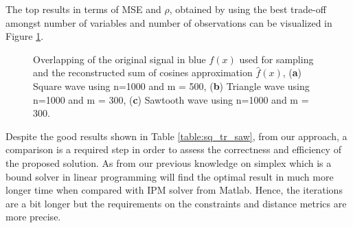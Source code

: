 \documentclass[journal,article,submit,electronics,pdftex]{Definitions/mdpi}
\begin{document}
{The top results in terms of MSE and $\rho$, obtained by using the best trade-off amongst number of variables and number of observations can be visualized in Figure \ref{fig:square_tr_saw}. 

\begin{figure}[H]
\centering
\hspace*{\fill}
%
\hspace*{\fill}
%
\newline
\centering
{}%

\caption{Overlapping of the original signal in blue $f(x)$ used for sampling and the reconstructed sum of cosines approximation $\hat{f}(x)$,
(\textbf{a}) Square wave using n=1000 and m = 500,
(\textbf{b}) Triangle wave using n=1000 and m = 300,
(\textbf{c}) Sawtooth wave using n=1000 and m = 300.}
\label{fig:square_tr_saw}
\end{figure}

Despite the good results shown in Table \ref{table:sq_tr_saw}, from our approach, a comparison is a required step in order to assess the correctness and efficiency of the proposed solution. As from our previous knowledge on simplex which is a bound solver in linear programming will find the optimal result in much more longer time when compared with IPM solver from Matlab. Hence, the iterations are a bit longer but the requirements on the constraints and distance metrics are more precise.

}
\end{document}
